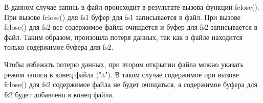 В данном случае запись в файл происходит в результате вызова функции fclose().
При вызове fclose() для fs1 буфер для fs1 записывается в файл.
При вызове fclose() для fs2 все содержимое файла очищается и буфер для fs2 записывается в файл.
Таким образом, произошла потеря данных, так как в файле находится только содержимое буфера для fs2.

Чтобы избежать потерю данных, при втором открытии файла можно указать режим записи в конец файла ("a").
В таком случае содержимое при вызове fclose() для fs2 содержимое файла не будет очищаться, а содержимое буфера для fs2 будет добавлено в конец файла.

